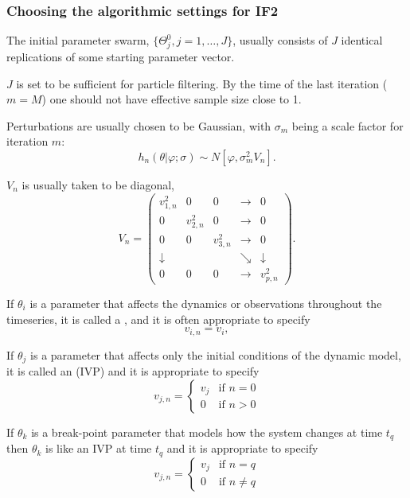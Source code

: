 \documentclass{beamer}\usepackage[]{graphicx}\usepackage[]{color}
\begin{document}
\begin{frame}[fragile]
\frametitle{Choosing the algorithmic settings for IF2}

\bi
\item  The initial parameter swarm, $\{ \Theta^0_j, j=1,\dots,J\}$, usually consists of $J$ identical replications of some starting parameter vector.

\item  $J$ is set to be sufficient for particle filtering. By the time of the last iteration ($m=M$) one should not have effective sample size close to 1. 

\item  Perturbations are usually chosen to be Gaussian, with $\sigma_m$ being a scale factor for iteration $m$:
$$h_n(\theta|\varphi;\sigma) \sim N[\varphi, \sigma^2_m V_n].$$

\item $V_n$ is usually taken to be diagonal,
$$ V_n = \left( \begin{array}{ccccc}
v_{1,n}^2 & 0 & 0 & \rightarrow & 0 \\
0 & v_{2,n}^2 &  0 & \rightarrow & 0 \\
0 & 0 & v_{3,n}^2 & \rightarrow & 0 \\
\downarrow & & & \searrow & \downarrow \\
0 & 0 & 0 & \rightarrow & v_{p,n}^2 \end{array}\right).$$
\item If $\theta_i$ is a parameter that affects the dynamics or observations throughout the timeseries, it is called a , and it is often appropriate to specify
$$ v_{i,n} = v_i,$$

\item  If $\theta_j$ is a parameter that affects only the initial conditions of the dynamic model, it is called an  (IVP) and it is appropriate to specify
$$ v_{j,n} = \left\{\begin{array}{ll} v_j & \mbox{if $n=0$} \\
0 & \mbox{if $n>0$} \end{array}\right.$$

\item  If $\theta_k$ is a break-point parameter that models how the system changes at time $t_q$ then $\theta_k$ is like an IVP at time $t_q$ and it is appropriate to specify
$$ v_{j,n} = \left\{\begin{array}{ll} v_j & \mbox{if $n=q$} \\
0 & \mbox{if $n\neq q$} \end{array}\right.$$


\end{frame}
\end{document}
